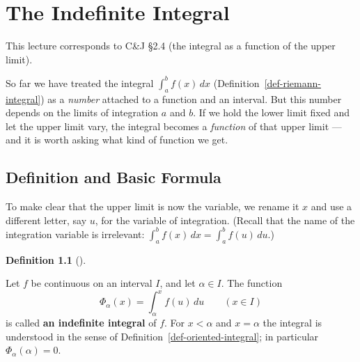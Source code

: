 \documentclass[
  letterpaper,
  DIV=11,
  numbers=noendperiod]{scrreprt}
\theoremstyle{plain}
\theoremstyle{plain}
\theoremstyle{definition}
\newtheorem{definition}{Definition}[chapter]
\theoremstyle{definition}
\theoremstyle{definition}
\theoremstyle{plain}
\theoremstyle{plain}
\theoremstyle{remark}
\begin{document}
\chapter{The Indefinite Integral}\label{the-indefinite-integral}

\begin{tcolorbox}[enhanced jigsaw, arc=.35mm, bottomrule=.15mm, bottomtitle=1mm, breakable, colback=white, colbacktitle=quarto-callout-note-color!10!white, colframe=quarto-callout-note-color-frame, coltitle=black, left=2mm, leftrule=.75mm, opacityback=0, opacitybacktitle=0.6, rightrule=.15mm, title={Companion reading}, titlerule=0mm, toprule=.15mm, toptitle=1mm]

This lecture corresponds to C\&J §2.4 (the integral as a function of the
upper limit).

\end{tcolorbox}

So far we have treated the integral \(\int_a^b f(x)\,dx\)
(Definition~\ref{def-riemann-integral}) as a \emph{number} attached to a
function and an interval. But this number depends on the limits of
integration \(a\) and \(b\). If we hold the lower limit fixed and let
the upper limit vary, the integral becomes a \emph{function} of that
upper limit --- and it is worth asking what kind of function we get.

\section{Definition and Basic
Formula}\label{definition-and-basic-formula}

To make clear that the upper limit is now the variable, we rename it
\(x\) and use a different letter, say \(u\), for the variable of
integration. (Recall that the name of the integration variable is
irrelevant: \(\int_a^b f(x)\,dx = \int_a^b f(u)\,du\).)

\begin{definition}[]\protect\hypertarget{def-indefinite-integral}{}\label{def-indefinite-integral}

\hfill\break
Let \(f\) be continuous on an interval \(I\), and let \(\alpha\in I\).
The function \[
\Phi_\alpha(x) = \int_\alpha^x f(u)\,du \qquad (x\in I)
\] is called \textbf{an indefinite integral} of \(f\). For \(x<\alpha\)
and \(x=\alpha\) the integral is understood in the sense of
Definition~\ref{def-oriented-integral}; in particular
\(\Phi_\alpha(\alpha)=0\).

\end{definition}
\end{document}
